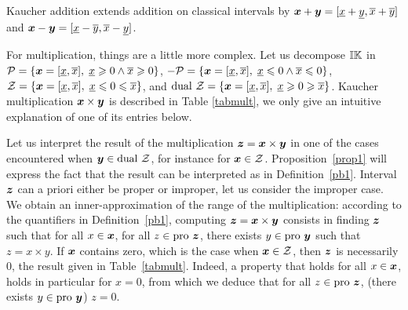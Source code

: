 \documentclass{sig-alternate-05-2015} %
\newcommand{\pro}{\mbox{pro }}
\def\K{{\Bbb I \Bbb K}}
\begin{document}
Kaucher addition extends addition on classical intervals by $\x+\y=[\underline x + \underline y,\overline x + \overline y]$ and 
$\x-\y=[\underline x - \overline y,\overline x - \underline y]$.

For multiplication, things are a little more complex. Let us decompose $\K$ in ${\cal P} = \{\x=[\underline x,\overline x], \; \underline x \geqslant 0 \wedge
\overline x \geqslant 0\}$, ${- \cal P} = \{\x=[\underline x,\overline x], \; \underline x \leqslant 0 \wedge
\overline x \leqslant 0\}$, 
${\cal Z} = \{\x=[\underline x,\overline x], \; \underline x \leqslant 0 \leqslant \overline x\}$, and 
${\mbox{dual } \cal Z} = \{\x=[\underline x,\overline x], \; \underline x \geqslant 0 \geqslant \overline x\}$. 
Kaucher multiplication $\x \times \y$ is described in Table \ref{tabmult}, we only give an 
intuitive explanation of one of its entries below. 

Let us  interpret the result of the multiplication $\z = \x \times \y$ in one of the cases encountered when $\y \in \mbox{dual } \cal Z$, 
for instance for $\x \in {\cal Z}$. Proposition~\ref{prop1} will express the fact that 
the result can be interpreted as in Definition~\ref{pb1}. Interval $\z$ can a priori either be proper or improper, 
let us consider the improper case. We obtain an inner-approximation of the range of the multiplication: 
according to the quantifiers in Definition~\ref{pb1}, 
computing $\z = \x \times \y$ consists in finding $\z$ such that 
for all $x \in \x$, for all $z \in \pro \z$, there exists $y \in \pro \y$ such that $z=x \times y$. If $\x$ contains zero, 
which is the case when $\x \in {\cal Z}$, then $\z$ is necessarily $0$, the result given in Table~\ref{tabmult}. 
Indeed, a property that holds for all $x \in \x$, holds in particular for $x=0$, from which we deduce that 
for all $z \in \pro \z$, (there exists $y \in \pro \y$) $z=0$.
\end{document}
